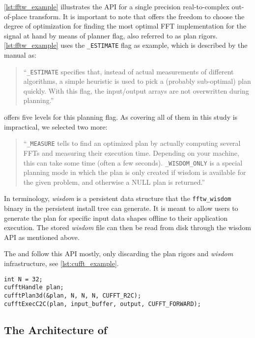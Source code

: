 \cref{lst:fftw_example} illustrates the \fftw{} API for a single precision real-to-complex out-of-place transform. It is important to note that \fftw{} offers the freedom to choose the degree of optimization for finding the most optimal FFT implementation for the signal at hand by means of planner flag, also referred to as plan rigors. \cref{lst:fftw_example} uses the \texttt{\fftw{}\_ESTIMATE} flag as example, which is described by the \fftw{} manual \cite{fftw_manual} as:
%
\begin{quote}
``\texttt{\fftw{}\_ESTIMATE} specifies that, instead of actual measurements of different algorithms, a simple heuristic is used to pick a (probably sub-optimal) plan quickly. With this flag, the input/output arrays are not overwritten during planning.''
\end{quote}
%
\fftw{} offers five levels for this planning flag. As covering all of them in this study is impractical, we selected two more:
\begin{quote}
``\texttt{\fftw{}\_MEASURE} tells \fftw{} to find an optimized plan by actually computing several FFTs and measuring their execution time. Depending on your machine, this can take some time (often a few seconds).\newline
\texttt{\fftw{}\_WISDOM\_ONLY} is a special planning mode in which the plan is only created if wisdom is available for the given problem, and otherwise a NULL plan is returned.''
\end{quote}
%
In \fftw{} terminology, \emph{wisdom} is a persistent data structure that the \texttt{fftw\_wisdom} binary in the persistent \fftw{} install tree can generate. It is meant to allow users to generate the plan for specific input data shapes offline to their application execution. The stored \emph{wisdom} file can then be read from disk through the \fftw{} wisdom API as mentioned above.

The \cufft{} and \clfft{} follow this API mostly, only discarding the plan rigors and \emph{wisdom} infrastructure, see \cref{lst:cufft_example}.

\begin{lstlisting}[caption={Minimal usage example of the \cufft{} single precision real-to-complex planner API. Memory management is omitted.},label={lst:cufft_example}]
int N = 32;
cufftHandle plan;
cufftPlan3d(&plan, N, N, N, CUFFT_R2C);
cufftExecC2C(plan, input_buffer, output, CUFFT_FORWARD);
\end{lstlisting}
%
\subsection{The Architecture of \gearshifft{}}
\label{ssec:gearshifft_arch}

